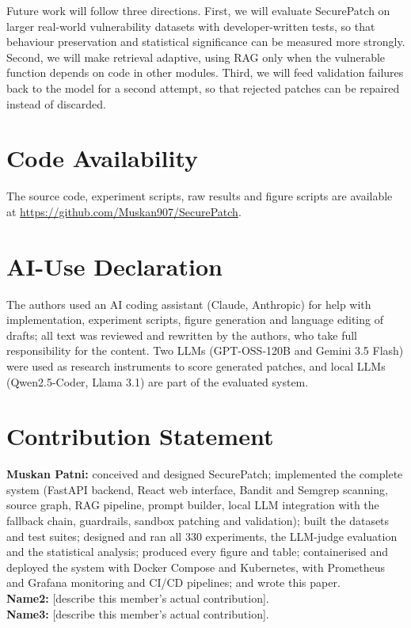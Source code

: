 \documentclass[12pt,onecolumn,draftclsnofoot]{IEEEtran}
\begin{document}
Future work will follow three directions. First, we will evaluate SecurePatch on larger real-world vulnerability datasets with developer-written tests, so that behaviour preservation and statistical significance can be measured more strongly. Second, we will make retrieval adaptive, using RAG only when the vulnerable function depends on code in other modules. Third, we will feed validation failures back to the model for a second attempt, so that rejected patches can be repaired instead of discarded.

\section*{Code Availability}
The source code, experiment scripts, raw results and figure scripts are available at \url{https://github.com/Muskan907/SecurePatch}.

\section*{AI-Use Declaration}
The authors used an AI coding assistant (Claude, Anthropic) for help with implementation, experiment scripts, figure generation and language editing of drafts; all text was reviewed and rewritten by the authors, who take full responsibility for the content. Two LLMs (GPT-OSS-120B and Gemini 3.5 Flash) were used as research instruments to score generated patches, and local LLMs (Qwen2.5-Coder, Llama 3.1) are part of the evaluated system.

\section*{Contribution Statement}
\noindent\textbf{Muskan Patni:} conceived and designed SecurePatch; implemented the complete system (FastAPI backend, React web interface, Bandit and Semgrep scanning, source graph, RAG pipeline, prompt builder, local LLM integration with the fallback chain, guardrails, sandbox patching and validation); built the datasets and test suites; designed and ran all 330 experiments, the LLM-judge evaluation and the statistical analysis; produced every figure and table; containerised and deployed the system with Docker Compose and Kubernetes, with Prometheus and Grafana monitoring and CI/CD pipelines; and wrote this paper.\\
\textbf{Name2:} [describe this member's actual contribution].\\
\textbf{Name3:} [describe this member's actual contribution].



\end{document}
